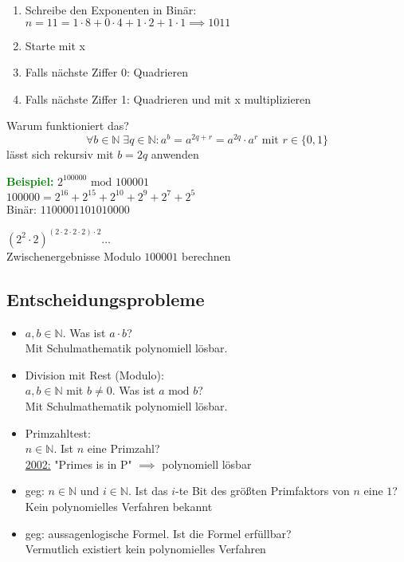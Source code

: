 \documentclass{article}
\newcommand{\green}[1]{\textcolor{green}{#1}}
\newcommand{\ex}{\green{\textbf{Beispiel: }}}
\newcommand{\N}{\mathbb{N}}
\renewcommand{\mod}{\text{ mod }}
\begin{document}
\begin{enumerate}
    \item Schreibe den Exponenten in Binär:\\
    $n = 11 = 1 \cdot 8 + 0 \cdot 4 + 1 \cdot 2 + 1 \cdot 1 \implies 1011$
    \item Starte mit x
    \item Falls nächste Ziffer 0: Quadrieren
    \item Falls nächste Ziffer 1: Quadrieren und mit x multiplizieren
\end{enumerate}

Warum funktioniert das?
\[
    \forall b \in \N \; \exists q \in \N: a^b = a^{2q+r} = a^{2q} \cdot a^r \text{ mit } r \in \{0,1\}
\]
lässt sich rekursiv mit $b = 2q$ anwenden

\ex $2^{100000} \mod 100001$\\
$100000 = 2^{16} + 2^{15} + 2^{10} + 2^9 + 2^7 + 2^5$\\
Binär: $1100001101010000$

$\left( 2^2 \cdot 2\right)^{(2 \cdot 2 \cdot 2 \cdot 2) \cdot 2} \dots$\\
Zwischenergebnisse Modulo $100001$ berechnen

\subsection{Entscheidungsprobleme}

\begin{itemize}
    \item $a,b \in \N$. Was ist $a \cdot b$?\\
    Mit Schulmathematik polynomiell lösbar.
    \item Division mit Rest (Modulo):\\
    $a,b \in \N$ mit $b \neq 0$. Was ist $a \mod b$?\\
    Mit Schulmathematik polynomiell lösbar.
    \item Primzahltest:\\
    $n \in \N$. Ist $n$ eine Primzahl?\\
    \underline{2002:} "Primes is in P" $\implies$ polynomiell lösbar
    \item geg: $n \in \N$ und $i \in \N$. Ist das $i$-te Bit des größten Primfaktors von $n$ eine $1$?\\
    Kein polynomielles Verfahren bekannt
    \item geg: aussagenlogische Formel. Ist die Formel erfüllbar?\\
    Vermutlich existiert kein polynomielles Verfahren
\end{itemize}
\end{document}
